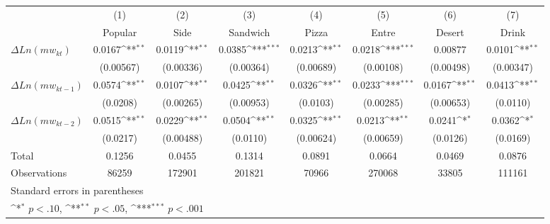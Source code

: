 {
\def\sym#1{\ifmmode^{#1}\else\(^{#1}\)\fi}
\begin{tabular}{l*{7}{c}}
\hline\hline
                    &\multicolumn{1}{c}{(1)}&\multicolumn{1}{c}{(2)}&\multicolumn{1}{c}{(3)}&\multicolumn{1}{c}{(4)}&\multicolumn{1}{c}{(5)}&\multicolumn{1}{c}{(6)}&\multicolumn{1}{c}{(7)}\\
                    &\multicolumn{1}{c}{Popular}&\multicolumn{1}{c}{Side}&\multicolumn{1}{c}{Sandwich}&\multicolumn{1}{c}{Pizza}&\multicolumn{1}{c}{Entre}&\multicolumn{1}{c}{Desert}&\multicolumn{1}{c}{Drink}\\
\hline
$\Delta Ln(mw_{kt})$  &      0.0167\sym{**} &      0.0119\sym{**} &      0.0385\sym{***}&      0.0213\sym{**} &      0.0218\sym{***}&     0.00877         &      0.0101\sym{**} \\
                    &   (0.00567)         &   (0.00336)         &   (0.00364)         &   (0.00689)         &   (0.00108)         &   (0.00498)         &   (0.00347)         \\
[1em]
$\Delta Ln(mw_{kt-1})$&      0.0574\sym{**} &      0.0107\sym{**} &      0.0425\sym{**} &      0.0326\sym{**} &      0.0233\sym{***}&      0.0167\sym{**} &      0.0413\sym{**} \\
                    &    (0.0208)         &   (0.00265)         &   (0.00953)         &    (0.0103)         &   (0.00285)         &   (0.00653)         &    (0.0110)         \\
[1em]
$\Delta Ln(mw_{kt-2}) $&      0.0515\sym{**} &      0.0229\sym{**} &      0.0504\sym{**} &      0.0325\sym{**} &      0.0213\sym{**} &      0.0241\sym{*}  &      0.0362\sym{*}  \\
                    &    (0.0217)         &   (0.00488)         &    (0.0110)         &   (0.00624)         &   (0.00659)         &    (0.0126)         &    (0.0169)         \\
\hline
Total & 0.1256 & 0.0455 & 0.1314 & 0.0891 & 0.0664 & 0.0469 & 0.0876 \\
Observations        &       86259         &      172901         &      201821         &       70966         &      270068         &       33805         &      111161         \\
\hline\hline
\multicolumn{8}{l}{\footnotesize Standard errors in parentheses}\\
\multicolumn{8}{l}{\footnotesize \sym{*} \(p<.10\), \sym{**} \(p<.05\), \sym{***} \(p<.001\)}\\
\end{tabular}
}
